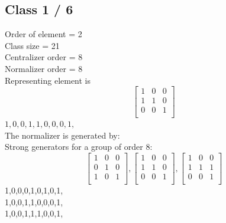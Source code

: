 \subsection*{Class 1 / 6}
Order of element = 2\\
Class size = 21\\
Centralizer order = 8\\
Normalizer order = 8\\
Representing element is
$$
\left[
\begin{array}{*{3}{r}}
1 & 0 & 0\\
1 & 1 & 0\\
0 & 0 & 1\\
\end{array}
\right]
$$
$1,0,0,1,1,0,0,0,1,$\\
The normalizer is generated by:\\
Strong generators for a group of order 8:
$$
\left[
\begin{array}{*{3}{r}}
1 & 0 & 0\\
0 & 1 & 0\\
1 & 0 & 1\\
\end{array}
\right]
, 
\left[
\begin{array}{*{3}{r}}
1 & 0 & 0\\
1 & 1 & 0\\
0 & 0 & 1\\
\end{array}
\right]
, 
\left[
\begin{array}{*{3}{r}}
1 & 0 & 0\\
1 & 1 & 1\\
0 & 0 & 1\\
\end{array}
\right]
$$
1,0,0,0,1,0,1,0,1,\\
1,0,0,1,1,0,0,0,1,\\
1,0,0,1,1,1,0,0,1,\\
\bigskip
